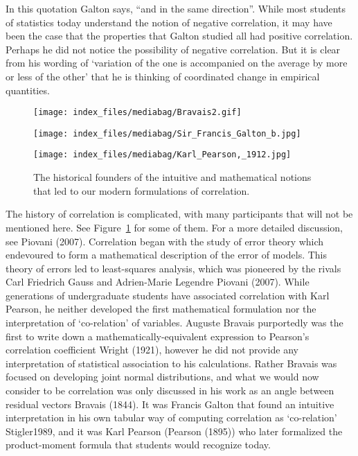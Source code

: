 \documentclass[
  letterpaper,
  DIV=11,
  numbers=noendperiod]{scrreprt}
\begin{document}
In this quotation Galton says, ``and in the same direction''. While most
students of statistics today understand the notion of negative
correlation, it may have been the case that the properties that Galton
studied all had positive correlation. Perhaps he did not notice the
possibility of negative correlation. But it is clear from his wording of
`variation of the one is accompanied on the average by more or less of
the other' that he is thinking of coordinated change in empirical
quantities.

\begin{figure}

\begin{minipage}{0.33\linewidth}

\texttt{[image: index\_files/mediabag/Bravais2.gif]}

\end{minipage}%
%
\begin{minipage}{0.33\linewidth}

\texttt{[image: index\_files/mediabag/Sir\_Francis\_Galton\_b.jpg]}

\end{minipage}%
%
\begin{minipage}{0.33\linewidth}

\texttt{[image: index\_files/mediabag/Karl\_Pearson,\_1912.jpg]}

\end{minipage}%

\caption{\label{fig-correlation-figures}The historical founders of the
intuitive and mathematical notions that led to our modern formulations
of correlation.}

\end{figure}%

The history of correlation is complicated, with many participants that
will not be mentioned here. See Figure~\ref{fig-correlation-figures} for
some of them. For a more detailed discussion, see Piovani (2007).
Correlation began with the study of error theory which endevoured to
form a mathematical description of the error of models. This theory of
errors led to least-squares analysis, which was pioneered by the rivals
Carl Friedrich Gauss and Adrien-Marie Legendre Piovani (2007). While
generations of undergraduate students have associated correlation with
Karl Pearson, he neither developed the first mathematical formulation
nor the interpretation of `co-relation' of variables. Auguste Bravais
purportedly was the first to write down a mathematically-equivalent
expression to Pearson's correlation coefficient Wright (1921), however
he did not provide any interpretation of statistical association to his
calculations. Rather Bravais was focused on developing joint normal
distributions, and what we would now consider to be correlation was only
discussed in his work as an angle between residual vectors Bravais
(1844). It was Francis Galton that found an intuitive interpretation in
his own tabular way of computing correlation as `co-relation'
Stigler1989, and it was Karl Pearson (Pearson (1895)) who later
formalized the product-moment formula that students would recognize
today.
\end{document}
